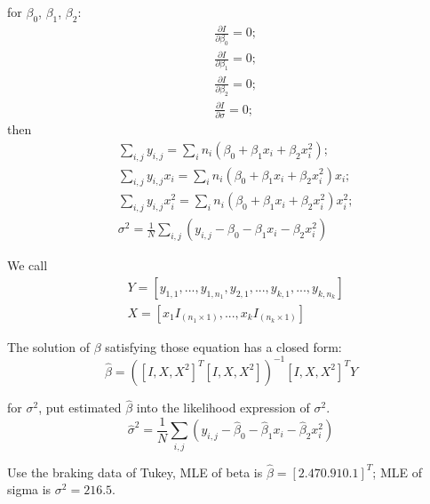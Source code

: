 \documentclass{article}
\begin{document}
for $\beta_{0}$, $\beta_{1}$, $\beta_{2}$:
\begin{equation}
\begin{aligned}
    & \frac{\partial I}{\partial \beta_{0}} = 0;\\
    & \frac{\partial I}{\partial \beta_{1}} = 0;\\
    & \frac{\partial I}{\partial \beta_{2}} = 0;\\
    & \frac{\partial I}{\partial \sigma} = 0;
\end{aligned}
\end{equation}
then
\begin{equation}
\begin{aligned}
    & \sum_{i,j} y_{i,j} = \sum_{i} n_{i}(\beta_{0}+\beta_{1}x_{i}+\beta_{2}x_{i}^{2});\\
    & \sum_{i,j} y_{i,j} x_{i} = \sum_{i} n_{i}(\beta_{0}+\beta_{1}x_{i}+\beta_{2}x_{i}^{2}) x_{i};\\
    & \sum_{i,j} y_{i,j} x_{i}^{2} = \sum_{i} n_{i}(\beta_{0}+\beta_{1}x_{i}+\beta_{2}x_{i}^{2})x_{i}^{2};\\
    & \sigma^2 = \frac{1}{N}\sum_{i,j}(y_{i,j}-\beta_{0}-\beta_{1}x_{i} - \beta_{2}x_{i}^{2})
\end{aligned}
\end{equation}

We call
\begin{equation}
\begin{aligned}
& Y = [y_{1,1},...,y_{1,n_{1}},y_{2,1},...,y_{k,1},...,y_{k,n_{k}}] \\
& X = [x_{1}I_{(n_{1} \times 1)},...,x_{k}I_{(n_{k}\times 1)}]
\end{aligned}
\end{equation}

The solution of $\beta$ satisfying those equation has a closed form:
\begin{equation}
    \hat{\beta} = ([I,X,X^2]^{T}[I,X,X^2])^{-1}[I,X,X^2]^{T} Y
\end{equation}

for $\sigma^2$, put estimated $\hat{\beta}$ into the likelihood expression of $\sigma^{2}$.
\begin{equation}
     \hat{\sigma}^2 = \frac{1}{N}\sum_{i,j}(y_{i,j}-\hat{\beta}_{0}-\hat{\beta}_{1}x_{i} - \hat{\beta}_{2}x_{i}^{2})
\end{equation}

Use the braking data of Tukey,
MLE of beta is $\hat{\beta} = [2.47 0.91 0.1]^{T}$; MLE of sigma is $\sigma^2 = 216.5$.
\end{document}
